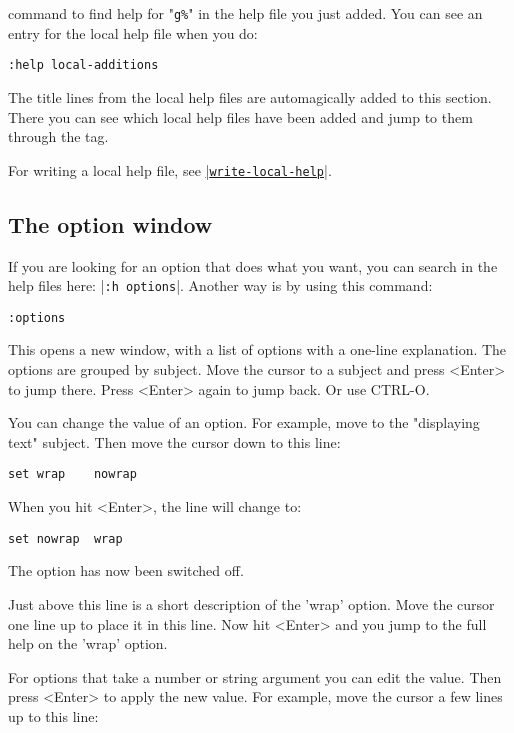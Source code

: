 command to find help for "\verb!g%!" in the help file you just added.
You can see an entry for the local help file when you do:

 \begin{Verbatim}[samepage=true]
 :help local-additions
 \end{Verbatim}

The title lines from the local help files are automagically added to this section.
There you can see which local help files have been added and jump to them through the tag.
 
For writing a local help file, see \hyperref[write-local-help]{|\texttt{write-local-help}|}.

\subsection{The option window}
If you are looking for an option that does what you want, you can search in the help files here: |\verb!:h options!|.
Another way is by using this command:

 \begin{Verbatim}[samepage=true]
 :options
 \end{Verbatim}

This opens a new window, with a list of options with a one-line explanation.
The options are grouped by subject.
Move the cursor to a subject and press <Enter> to jump there.
Press <Enter> again to jump back.
Or use CTRL-O.

You can change the value of an option.
For example, move to the "displaying text" subject.
Then move the cursor down to this line:

\begin{Verbatim}[samepage=true]
    set wrap    nowrap 
\end{Verbatim}

When you hit <Enter>, the line will change to:

\begin{Verbatim}[samepage=true]
    set nowrap  wrap 
\end{Verbatim}

The option has now been switched off.

Just above this line is a short description of the 'wrap' option.
Move the cursor one line up to place it in this line.
Now hit <Enter> and you jump to the full help on the 'wrap' option.

For options that take a number or string argument you can edit the value.
Then press <Enter> to apply the new value.
For example, move the cursor a few lines up to this line:
 
